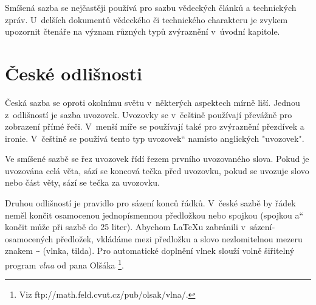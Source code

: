 \documentclass[11pt,a4paper,twocolumn,oneside]{article}
\providecommand{\uv}[1]{\quotedblbase #1\textquotedblleft}
\begin{document}
Smíšená sazba se nejčastěji používá pro sazbu vědeckých článků a technických zpráv. U~delší­ch dokumentů vědeckého či technického charakteru je zvykem upozornit čtenáře na význam různých typů zvýraznění­ v~úvodní­ kapitole.

	\section{České odlišnosti}

Česká sazba se oproti okolní­mu světu v~některých aspektech mí­rně liší­. Jednou z~odlišností je sazba uvozovek. Uvozovky se v~češtině použí­vají­ převážně pro zobrazení­ pří­mé řeči. V~menší­ míře se použí­vají­ také pro zvýraznění­ přezdí­vek a ironie. V~češtině se použí­vá tento typ \uv{uvozovek} namísto anglických "uvozovek".

Ve smíšené sazbě se řez uvozovek ří­dí­ řezem první­ho uvozovaného slova. Pokud je uvozována celá věta, sází­ se koncová tečka před uvozovku, pokud se uvozuje slovo nebo část věty, sází­ se tečka za uvozovku.

Druhou odlišností je pravidlo pro sázení­ konců řádků. V~české sazbě by řádek neměl končit osamocenou jednopí­smennou předložkou nebo spojkou (spojkou \uv{a} končit může při sazbě do 25 liter). Abychom \LaTeX u zabránili v~sázení­ osamocených předložek, vkládáme mezi předložku a slovo nezlomitelnou mezeru znakem \verb|~| (vlnka, tilda). Pro automatické doplnění vlnek slouží­ volně šiřitelný program {\itshape vlna} od pana Olšáka \footnote{Viz ftp://math.feld.cvut.cz/pub/olsak/vlna/.}.
\end{document}
